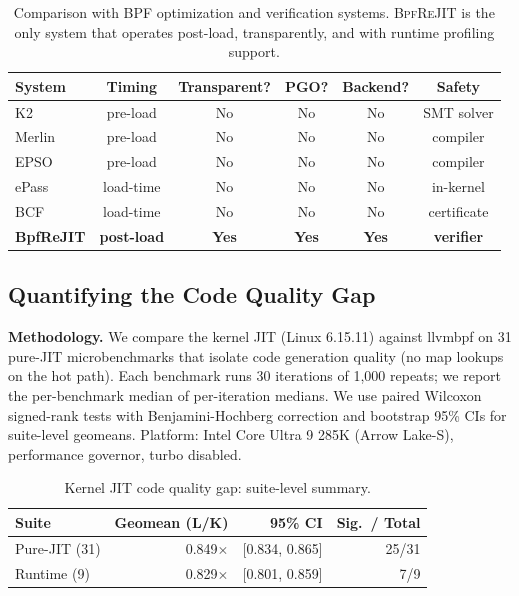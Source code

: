 \documentclass[sigconf,anonymous]{acmart}
\begin{document}
\begin{table}[t]
  \centering
  \caption{Comparison with BPF optimization and verification systems.
  \textsc{BpfReJIT} is the only system that operates post-load,
  transparently, and with runtime profiling support.}
  \label{tab:existing_work}
  \small
  \begin{tabular}{lccccc}
    \toprule
    System & Timing & Transparent? & PGO? & Backend? & Safety \\
    \midrule
    K2~\cite{k2}          & pre-load  & No  & No  & No  & SMT solver \\
    Merlin~\cite{merlin}  & pre-load  & No  & No  & No  & compiler \\
    EPSO~\cite{epso}      & pre-load  & No  & No  & No  & compiler \\
    ePass~\cite{epass}    & load-time & No  & No  & No  & in-kernel \\
    BCF~\cite{bcf}        & load-time & No  & No  & No  & certificate \\
    \textbf{BpfReJIT}     & \textbf{post-load} & \textbf{Yes} & \textbf{Yes} & \textbf{Yes} & \textbf{verifier} \\
    \bottomrule
  \end{tabular}
\end{table}

\subsection{Quantifying the Code Quality Gap}
\label{sec:characterization}

\textbf{Methodology.} We compare the kernel JIT (Linux 6.15.11) against
llvmbpf on 31 pure-JIT microbenchmarks that isolate code generation
quality (no map lookups on the hot path). Each benchmark runs 30
iterations of 1{,}000 repeats; we report the per-benchmark median of
per-iteration medians. We use paired Wilcoxon signed-rank tests with
Benjamini-Hochberg correction and bootstrap 95\% CIs for suite-level
geomeans. Platform: Intel Core Ultra 9 285K (Arrow Lake-S), performance
governor, turbo disabled.

\begin{table}[t]
  \centering
  \caption{Kernel JIT code quality gap: suite-level summary.}
  \label{tab:exec_summary}
  \begin{tabular}{lrrr}
    \toprule
    Suite & Geomean (L/K) & 95\% CI & Sig.\ / Total \\
    \midrule
    Pure-JIT (31) & 0.849$\times$ & [0.834, 0.865] & 25/31 \\
    Runtime (9)   & 0.829$\times$ & [0.801, 0.859] & 7/9   \\
    \bottomrule
  \end{tabular}
\end{table}
\end{document}
